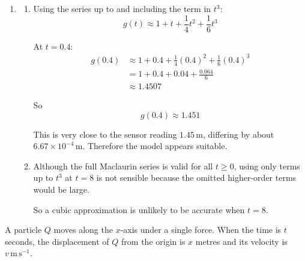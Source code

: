 \documentclass[leqno]{article}
\begin{document}
\begin{enumerate}[
  label=\textbf{\arabic*.},
  leftmargin=*,
  topsep=0pt,
  partopsep=0pt,
  parsep=0pt
]
\begin{djsSolution}
\begin{enumerate}[label=\textbf{(\alph*)}]
\begin{enumerate}[label=(\roman*)]
    Now substitute $t=0$.

    From earlier parts:
    \[
    g'(0)=1,
    \qquad
    g''(0)=\frac12
    \]

    So
    \begin{align*}
    4-1-2\left(\frac12\right)&=2g'''(0)\\
    4-1-1&=2g'''(0)\\
    2&=2g'''(0)
    \end{align*}

    Hence
    \[
    g'''(0)=1
    \]

    The $t^3$ term in the Maclaurin series is therefore
    \[
    \frac{t^3}{3!}g'''(0)
    =\frac{t^3}{6}\times 1
    =\frac16 t^3
    \]
  \end{enumerate}

  \item
  \begin{enumerate}[label=(\roman*)]
    \item Using the series up to and including the term in $t^3$:
    \[
    g(t)\approx 1+t+\frac14 t^2+\frac16 t^3
    \]

    At $t=0.4$:
    \begin{align*}
    g(0.4)&\approx 1+0.4+\frac14(0.4)^2+\frac16(0.4)^3\\
    &=1+0.4+0.04+\frac{0.064}{6}\\
    &\approx 1.4507
    \end{align*}

    So
    \[
    g(0.4)\approx 1.451
    \]

    This is very close to the sensor reading $1.45\,\mathrm{m}$, differing by about $6.67\times10^{-4}\,\mathrm{m}$. Therefore the model appears suitable.

    \item Although the full Maclaurin series is valid for all $t\ge 0$, using only terms up to $t^3$ at $t=8$ is not sensible because the omitted higher-order terms would be large.

    So a cubic approximation is unlikely to be accurate when $t=8$.
  \end{enumerate}
\end{enumerate}
\end{djsSolution}


\newpage

\questionitem

A particle $Q$ moves along the $x$-axis under a single force. When the time is $t$ seconds, the displacement of $Q$ from the origin is $x$ metres and its velocity is $v\,\mathrm{m\,s^{-1}}$. \\


\end{enumerate}
\end{document}
